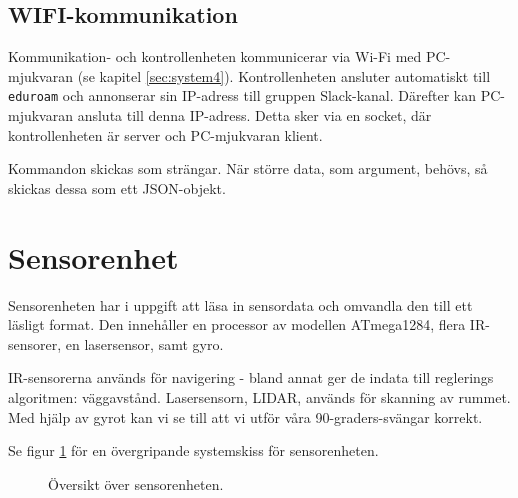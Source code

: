 \documentclass[a4paper,11pt]{article}
\begin{document}
\subsection{WIFI-kommunikation}
Kommunikation- och kontrollenheten kommunicerar via Wi-Fi med PC-mjukvaran (se kapitel \ref{sec:system4}). Kontrollenheten ansluter automatiskt till \texttt{eduroam} och annonserar sin IP-adress till gruppen Slack-kanal. Därefter kan PC-mjukvaran ansluta till denna IP-adress. Detta sker via en socket, där kontrollenheten är server och PC-mjukvaran klient. %

Kommandon skickas som strängar. När större data, som argument, behövs, så skickas dessa som ett JSON-objekt.


\clearpage
\section{Sensorenhet} \label{sec:system1}
Sensorenheten har i uppgift att läsa in sensordata och omvandla den till ett läsligt format. Den innehåller en processor av modellen ATmega1284, flera IR-sensorer, en lasersensor, samt gyro.

IR-sensorerna används för navigering - bland annat ger de indata till reglerings algoritmen: väggavstånd. Lasersensorn, LIDAR, används för skanning av rummet. Med hjälp av gyrot kan vi se till att vi utför våra 90-graders-svängar korrekt.

Se figur \ref{fig:unitSensor} för en övergripande systemskiss för sensorenheten.

\begin{figure}[h!]
	\caption{Översikt över sensorenheten.}
	\label{fig:unitSensor}
\end{figure}
\end{document}
